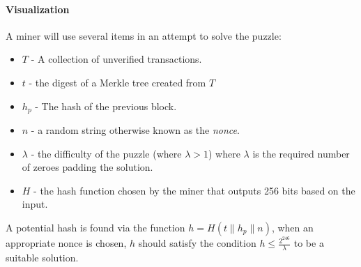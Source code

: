\paragraph{Visualization}

\newpage{} \label{blockchainnotes}

A miner will use several items in an attempt to solve the puzzle:

\begin{itemize}
  \item $T$ - A collection of unverified transactions.
  \item $t$ - the digest of a Merkle tree created from $T$
  \item $h_p$ - The hash of the previous block.
  \item $n$ - a random string otherwise known as the \textit{nonce}.
  \item $\lambda$ - the difficulty of the puzzle (where $\lambda > 1$) where $\lambda$ is the required number of zeroes padding the solution.
  \item $H$ - the hash function chosen by the miner that outputs 256 bits based on the input.
\end{itemize}
A potential hash is found via the function $h = H(t \| h_p \| n)$, when an appropriate nonce is chosen, $h$ should satisfy the condition $h \leq \frac{2^{246}}{\lambda}$ to be a suitable solution.
